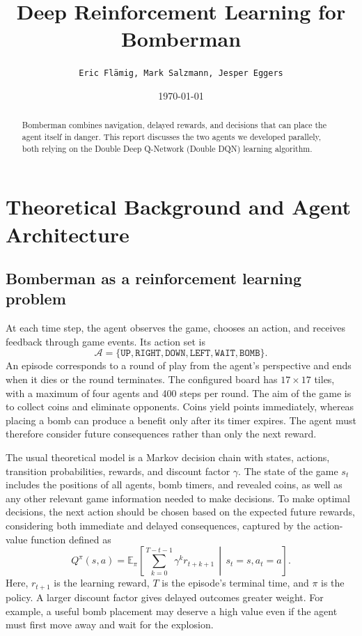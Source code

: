 \documentclass[11pt,a4paper]{article}
\title{Deep Reinforcement Learning for Bomberman}
\author{\texttt{Eric Flämig, Mark Salzmann, Jesper Eggers}}
\date{\today}
\begin{document}
\maketitle

\begin{abstract}
Bomberman combines navigation, delayed rewards, and decisions that can place
the agent itself in danger. 
This report discusses the two agents we developed parallely, both relying on the Double Deep Q-Network (Double DQN) learning algorithm.
\end{abstract}

\section{Theoretical Background and Agent Architecture}
\label{sec:theory}

\subsection{Bomberman as a reinforcement learning problem}
At each time step, the agent observes the game, chooses an action, and receives
feedback through game events. Its action set is
\[
\mathcal{A}=\{\texttt{UP}, \texttt{RIGHT}, \texttt{DOWN}, \texttt{LEFT}, \texttt{WAIT},\texttt{BOMB}\}.
\]
An episode corresponds to a round of play from the agent's perspective and
ends when it dies or the round terminates. The configured board has
$17\times17$ tiles, with a maximum of four agents and 400 steps per round.
The aim of the game is to collect coins and eliminate opponents. Coins yield points immediately, whereas placing a bomb can produce a benefit
only after its timer expires. The agent must therefore consider future
consequences rather than only the next reward.

The usual theoretical model is a Markov decision chain with states,
actions, transition probabilities, rewards, and discount factor $\gamma$.
The state of the game $s_t$ includes the positions of all agents, bomb timers, and revealed coins, as well as any other relevant game information needed to make decisions.
To make optimal decisions, the next action should be chosen based on the expected future rewards, considering both immediate and delayed consequences, captured by the action-value function defined as
\begin{equation}
Q^\pi(s,a)=\mathbb{E}_{\pi}\!\left[
\sum_{k=0}^{T-t-1}\gamma^k r_{t+k+1}
\,\middle|\,s_t=s,a_t=a\right].
\end{equation}
Here, $r_{t+1}$ is the learning reward, $T$ is the episode's terminal time,
and $\pi$ is the policy. A larger discount factor gives delayed outcomes
greater weight. For example, a useful bomb placement may deserve a high value
even if the agent must first move away and wait for the explosion.
\end{document}
